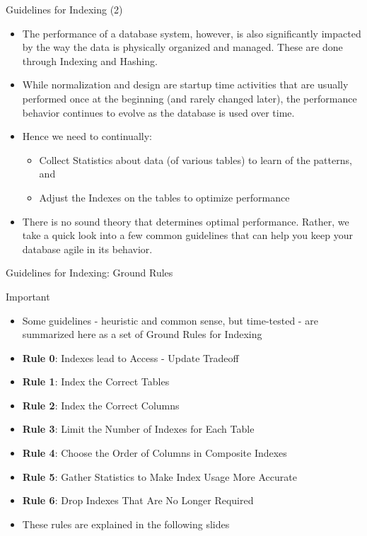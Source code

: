\documentclass[aspectratio=169, xcolor=dvipsnames]{beamer}
\begin{document}
\begin{frame}{Guidelines for Indexing (2)}
    \begin{itemize}[<+->]
        \item The performance of a database system, however, is also significantly impacted by the way the data is physically organized and managed. These are done through Indexing and Hashing.
        \item While normalization and design are startup time activities that are usually performed once at the beginning (and rarely changed later), the performance behavior continues to evolve as the database is used over time. 
        \item Hence we need to continually:
        \begin{itemize}[<+->]
            \item Collect Statistics about data (of various tables) to learn of the patterns, and
            \item Adjust the Indexes on the tables to optimize performance
        \end{itemize}
        \item There is no sound theory that determines optimal performance. Rather, we take a quick look into a few common guidelines that can help you keep your database agile in its behavior.
    \end{itemize}
\end{frame}

\begin{frame}{Guidelines for Indexing: Ground Rules}
    \begin{alertblock}{Important}
        \begin{itemize}[<+->]
            \item Some guidelines - heuristic and common sense, but time-tested - are summarized here as a set of Ground Rules for Indexing
            \item \textbf{Rule 0}: Indexes lead to Access - Update Tradeoff
            \item \textbf{Rule 1}: Index the Correct Tables
            \item \textbf{Rule 2}: Index the Correct Columns
            \item \textbf{Rule 3}: Limit the Number of Indexes for Each Table
            \item \textbf{Rule 4}: Choose the Order of Columns in Composite Indexes
            \item \textbf{Rule 5}: Gather Statistics to Make Index Usage More Accurate
            \item \textbf{Rule 6}: Drop Indexes That Are No Longer Required
            \item These rules are explained in the following slides
        \end{itemize}
    \end{alertblock}
\end{frame}
\end{document}
